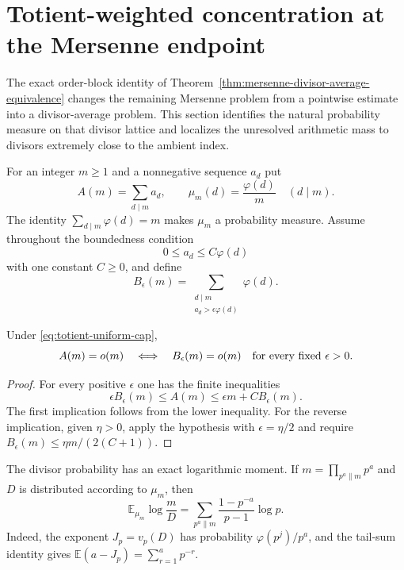 \section{Totient-weighted concentration at the Mersenne endpoint}
\label{sec:mersenne-totient-concentration}

The exact order-block identity of
Theorem~\ref{thm:mersenne-divisor-average-equivalence} changes the remaining
Mersenne problem from a pointwise estimate into a divisor-average problem.
This section identifies the natural probability measure on that divisor
lattice and localizes the unresolved arithmetic mass to divisors extremely
close to the ambient index.

For an integer $m\ge1$ and a nonnegative sequence $a_d$ put
\[
 A(m)=\sum_{d\mid m}a_d,
 \qquad
 \mu_m(d)=\frac{\varphi(d)}m\quad(d\mid m).
\]
The identity $\sum_{d\mid m}\varphi(d)=m$ makes $\mu_m$ a probability
measure.  Assume throughout the boundedness condition
\begin{equation}\label{eq:totient-uniform-cap}
             0\le a_d\le C\varphi(d)
\end{equation}
with one constant $C\ge0$, and define
\[
 B_\epsilon(m)=
 \sum_{\substack{d\mid m\\a_d>\epsilon\varphi(d)}}\varphi(d).
\]

\begin{theorem}
\label{thm:totient-exceptional-mass-criterion}
Under \eqref{eq:totient-uniform-cap},
\[
 A(m)=o(m)
 \quad\Longleftrightarrow\quad
 B_\epsilon(m)=o(m)\quad\hbox{for every fixed }\epsilon>0.
\]
\end{theorem}

\begin{proof}
For every positive $\epsilon$ one has the finite inequalities
\[
 \epsilon B_\epsilon(m)\le A(m)
 \le \epsilon m+C B_\epsilon(m).
\]
The first implication follows from the lower inequality.  For the reverse
implication, given $\eta>0$, apply the hypothesis with
$\epsilon=\eta/2$ and require
$B_\epsilon(m)\le\eta m/(2(C+1))$.
\end{proof}

The divisor probability has an exact logarithmic moment.  If
$m=\prod_{p^a\parallel m}p^a$ and $D$ is distributed according to $\mu_m$,
then
\begin{equation}\label{eq:totient-log-deficit-moment}
 \mathbb E_{\mu_m}\log\frac mD
 =\sum_{p^a\parallel m}
   \frac{1-p^{-a}}{p-1}\log p.
\end{equation}
Indeed, the exponent $J_p=v_p(D)$ has probability
$\varphi(p^j)/p^a$, and the tail-sum identity gives
$\mathbb E(a-J_p)=\sum_{r=1}^ap^{-r}$.

